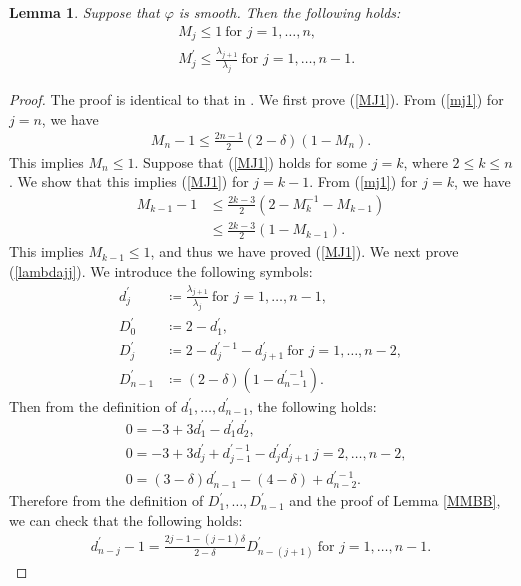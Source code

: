 \documentclass[12pt]{article}
\theoremstyle{definition}
\newtheorem{lemm}[defi]{Lemma}
\begin{document}
\begin{lemm}\label{26}{\it Suppose that $\varphi$ is smooth. Then the following holds:
\begin{align}
&M_j\leq 1\ \text{for $j=1,\dots, n$}, \label{MJ1} \\
&M_j^\prime\leq \frac{\lambda_{j+1}}{\lambda_j} \ \text{for $j=1,\dots, n-1$}. \label{lambdajj}
\end{align}
}
\end{lemm}
\begin{proof} The proof is identical to that in \cite[pp.23–24]{LM1}. We first prove (\ref{MJ1}). From (\ref{mj1}) for $j=n$, we have 
\begin{align*}
M_n-1\leq \frac{2n-1}{2}(2-\delta)(1-M_n).
\end{align*}
This implies $M_n\leq 1$. Suppose that (\ref{MJ1}) holds for some $j=k$, where $2\leq k\leq n$. We show that this implies (\ref{MJ1}) for $j=k-1$. From (\ref{mj1}) for $j=k$, we have 
\begin{align*}
M_{k-1}-1&\leq \frac{2k-3}{2}(2-M_k^{-1}-M_{k-1}) \\
&\leq \frac{2k-3}{2}(1-M_{k-1}).
\end{align*}
This implies $M_{k-1}\leq 1$, and thus we have proved (\ref{MJ1}). We next prove (\ref{lambdajj}). We introduce the following symbols:
\begin{align*}
d_j^\prime&\coloneqq \frac{\lambda_{j+1}}{\lambda_j}\ \text{for $j=1,\dots, n-1$}, \\
D_0^\prime&\coloneqq 2-d_1^\prime, \\
D_j^\prime&\coloneqq 2-d_j^{\prime-1}-d_{j+1}^\prime \ \text{for $j=1,\dots, n-2$}, \\
D_{n-1}^\prime&\coloneqq (2-\delta)(1-d_{n-1}^{\prime-1}).
\end{align*}
Then from the definition of $d_1^\prime,\dots, d_{n-1}^\prime$, the following holds:
\begin{align}
&0=-3+3d_1^\prime-d_1^\prime d_2^\prime, \\
&0=-3+3d_j^\prime+d_{j-1}^{\prime-1}-d_j^\prime d_{j+1}^\prime\ \text{$j=2,\dots, n-2$}, \\
&0=(3-\delta)d_{n-1}^\prime-(4-\delta)+d_{n-2}^{\prime-1}. 
\end{align}
Therefore from the definition of $D_1^\prime,\dots, D_{n-1}^\prime$ and the proof of Lemma \ref{MMBB}, we can check that the following holds:
\begin{align}
d_{n-j}^\prime-1=\frac{2j-1-(j-1)\delta}{2-\delta}D_{n-(j+1)}^\prime\ \text{for $j=1,\dots, n-1$}. \label{djp1}

\end{align}
\end{proof}
\end{document}
